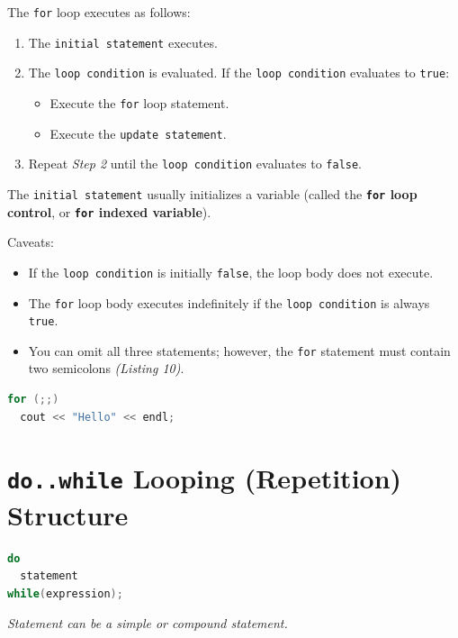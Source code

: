 \documentclass{article}
\begin{document}
The \texttt{for} loop executes as follows:
\begin{enumerate}
  \item The \texttt{initial statement} executes.
  \item The \texttt{loop condition} is evaluated. If the \texttt{loop condition} evaluates
to \texttt{true}:
  \begin{itemize}
    \item Execute the \texttt{for} loop statement.
    \item Execute the \texttt{update statement}.
  \end{itemize}
\item Repeat \textit{Step 2} until the \texttt{loop condition} evaluates to 
    \texttt{false}.
\end{enumerate}

The \texttt{initial statement} usually initializes a variable (called the
\textbf{\texttt{for} loop control}, or \textbf{\texttt{for} indexed variable}).

\vspace{8pt}
Caveats:
\begin{itemize}
  \item If the \texttt{loop condition} is initially \texttt{false}, the loop body does not execute.
  \item The \texttt{for} loop body executes indefinitely if the \texttt{loop condition}
is always \texttt{true}.
  \item You can omit all three statements; however, the \texttt{for} statement
    must contain two semicolons \textit{(Listing 10)}.
\end{itemize}

\begin{lstlisting}[language=C++, caption={\texttt{for} Loop Gotcha}]
for (;;)
  cout << "Hello" << endl;
\end{lstlisting}

\section{\texttt{do..while} Looping (Repetition) Structure}

\begin{lstlisting}[language=C++, caption={\texttt{do..while} Loop Syntax}]
do
  statement
while(expression);
\end{lstlisting}
\textit{Statement can be a simple or compound statement.}
\end{document}
